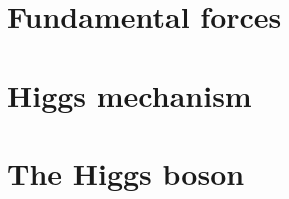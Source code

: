 \section{Fundamental forces}
\section{Higgs mechanism}
\section{The Higgs boson}

\cite{Rowling_1997}
\cite{Thor_2011}